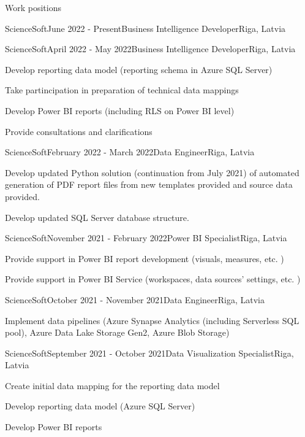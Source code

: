 \documentclass{resume} %
\begin{document}
\begin{rSection}{Work positions}

\begin{rSubsection}{ScienceSoft}{June 2022 - Present}{Business Intelligence Developer}{Riga, Latvia}
\item 
\end{rSubsection}

\begin{rSubsection}{ScienceSoft}{April 2022 - May 2022}{Business Intelligence Developer}{Riga, Latvia}
\item Develop reporting data model (reporting schema in Azure SQL Server)
\item Take partincipation in preparation of technical data mappings
\item Develop Power BI reports (including RLS on Power BI level)
\item Provide consultations and clarifications
\end{rSubsection}

\begin{rSubsection}{ScienceSoft}{February 2022 - March 2022}{Data Engineer}{Riga, Latvia}
\item Develop updated Python solution (continuation from July 2021) of automated generation of PDF report files from new templates provided and source data provided.
\item Develop updated SQL Server database structure.
\end{rSubsection}

\begin{rSubsection}{ScienceSoft}{November 2021 - February 2022}{Power BI Specialist}{Riga, Latvia}
\item Provide support in Power BI report development (visuals, measures, etc. )
\item Provide support in Power BI Service (workspaces, data sources' settings, etc. )
\end{rSubsection}

\begin{rSubsection}{ScienceSoft}{October 2021 - November 2021}{Data Engineer}{Riga, Latvia}
\item Implement data pipelines (Azure Synapse Analytics (including Serverless SQL pool), Azure Data Lake Storage Gen2, Azure Blob Storage)
\end{rSubsection}

\begin{rSubsection}{ScienceSoft}{September 2021 - October 2021}{Data Visualization Specialist}{Riga, Latvia}
\item Create initial data mapping for the reporting data model
\item Develop reporting data model (Azure SQL Server)
\item Develop Power BI reports
\end{rSubsection}


\end{rSection}
\end{document}
